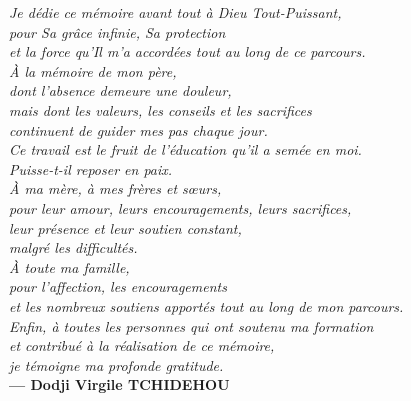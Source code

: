 \vspace*{\fill}

\newpage


\vspace*{\fill}

\begin{flushright}
\normalsize

\textit{Je dédie ce mémoire avant tout à Dieu Tout-Puissant,}\\
\textit{pour Sa grâce infinie, Sa protection}\\
\textit{et la force qu'Il m'a accordées tout au long de ce parcours.}\\[0.8cm]

\textit{À la mémoire de mon père,}\\[0.3cm]
\textit{dont l'absence demeure une douleur,}\\
\textit{mais dont les valeurs, les conseils et les sacrifices}\\
\textit{continuent de guider mes pas chaque jour.}\\
\textit{Ce travail est le fruit de l'éducation qu'il a semée en moi.}\\
\textit{Puisse-t-il reposer en paix.}\\[0.8cm]

\textit{À ma mère, à mes frères et sœurs,}\\[0.3cm]
\textit{pour leur amour, leurs encouragements, leurs sacrifices,}\\
\textit{leur présence et leur soutien constant,}\\
\textit{malgré les difficultés.}\\[0.8cm]

\textit{À toute ma famille,}\\[0.3cm]
\textit{pour l'affection, les encouragements}\\
\textit{et les nombreux soutiens apportés tout au long de mon parcours.}\\[0.8cm]

\textit{Enfin, à toutes les personnes qui ont soutenu ma formation}\\
\textit{et contribué à la réalisation de ce mémoire,}\\
\textit{je témoigne ma profonde gratitude.}\\[1cm]

\textbf{--- Dodji Virgile TCHIDEHOU}

\end{flushright}

\vspace*{\fill}

